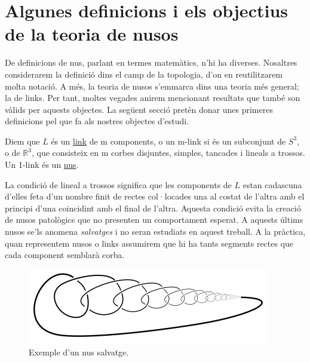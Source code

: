 
\section{Algunes definicions i els objectius de la teoria de nusos}\label{sec:Algunes definicions i els objectius de la teoria de nusos}

De definicions de nus, parlant en termes matemàtics, n'hi ha diverses. Nosaltres considerarem la definició dins el camp de la topologia, d'on en reutilitzarem molta notació. A més, la teoria de nusos s'emmarca dins una teoria més general; la de links. Per tant, moltes vegades anirem mencionant resultats que també son vàlids per aquests objectes. La següent secció pretén donar unes primeres definicions pel que fa als nostres objectes d'estudi.

\begin{definition}\label{def: Definició de nus}
	Diem que $L$ és un \underline{link} de m components, o un m-link si és un subconjunt de $S^3$, o de $\mathbb{R}^3$, que consisteix en m corbes disjuntes, simples, tancades i lineals a trossos. Un 1-link és un \underline{nus}.
\end{definition}

La condició de lineal a trossos significa que les components de $L$ estan cadascuna d'elles feta d'un nombre finit de rectes col·locades una al costat de l'altra amb el principi d'una coincidint amb el final de l'altra. Aquesta condició evita la creació de nusos patològics que no presenten un comportament esperat. A aquests últims nusos se'ls anomena \textit{salvatges} i no seran estudiats en aquest treball. A la pràctica, quan representem nusos o links assumirem que hi ha tants segments rectes que cada component semblarà corba.\\

\begin{figure}
	\centering
	\includegraphics[width=0.9\linewidth]{img/wildknot.png}
	\caption{Exemple d'un nus salvatge.}\label{fig:nussalvatge}
\end{figure}

